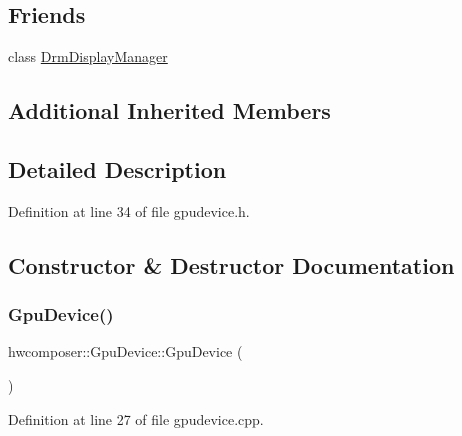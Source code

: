 \subsection*{Friends}
\begin{DoxyCompactItemize}
\item 
class \mbox{\hyperlink{classhwcomposer_1_1GpuDevice_a4f7966ae9851735e6eddc713ec174b2f}{Drm\+Display\+Manager}}
\end{DoxyCompactItemize}
\subsection*{Additional Inherited Members}


\subsection{Detailed Description}


Definition at line 34 of file gpudevice.\+h.



\subsection{Constructor \& Destructor Documentation}
\mbox{\label{classhwcomposer_1_1GpuDevice_a058336b2b96090c51011b2d8e24a9765}} 
\subsubsection{\texorpdfstring{Gpu\+Device()}{GpuDevice()}}
{\footnotesize\ttfamily hwcomposer\+::\+Gpu\+Device\+::\+Gpu\+Device (\begin{DoxyParamCaption}{ }\end{DoxyParamCaption})}



Definition at line 27 of file gpudevice.\+cpp.


\begin{DoxyCode}{0}
\end{DoxyCode}
\mbox{\label{classhwcomposer_1_1GpuDevice_a2ccba76dae02bd1b810a90bb5c3c4183}} 
